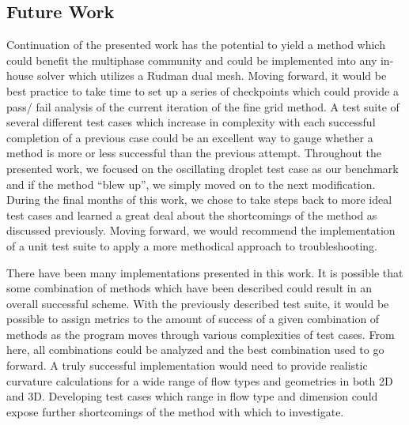 \subsection{Future Work}
Continuation of the presented work has the potential to yield a method which could benefit the multiphase community and could be implemented into any in-house solver which utilizes a Rudman dual mesh. Moving forward, it would be best practice to take time to set up a series of checkpoints which could provide a pass/ fail analysis of the current iteration of the fine grid method. A test suite of several different test cases which increase in complexity with each successful completion of a previous case could be an excellent way to gauge whether a method is more or less successful than the previous attempt. Throughout the presented work, we focused on the oscillating droplet test case as our benchmark and if the method ``blew up'', we simply moved on to the next modification. During the final months of this work, we chose to take steps back to more ideal test cases and learned a great deal about the shortcomings of the method as discussed previously. Moving forward, we would recommend the implementation of a unit test suite to apply a more methodical approach to troubleshooting.

There have been many implementations presented in this work. It is possible that some combination of methods which have been described could result in an overall successful scheme. With the previously described test suite, it would be possible to assign metrics to the amount of success of a given combination of methods as the program moves through various complexities of test cases. From here, all combinations could be analyzed and the best combination used to go forward. A truly successful implementation would need to provide realistic curvature calculations for a wide range of flow types and geometries in both 2D and 3D. Developing test cases which range in flow type and dimension could expose further shortcomings of the method with which to investigate.  

